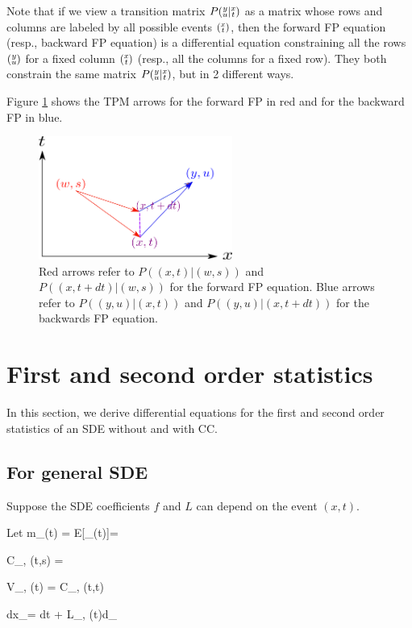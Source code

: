 Note that if we view
a transition matrix 
$P({\substack{y\\u}}|{\substack{x\\t}})$  as a matrix whose rows and columns are labeled by 
all possible events $({\substack{x\\t}})$, then the forward FP equation (resp., backward FP equation)
is a differential equation
constraining all the rows $({\substack{y\\u}})$ for a fixed column
$({\substack{x\\t}})$
(resp., all the columns for a fixed row).
They both constrain
the same matrix $P({\substack{y\\u}}|{\substack{x\\t}})$,
but in 2 different ways.

Figure \ref{fig-fokker-planck}
shows the TPM arrows for the
forward FP 
in red and for the
backward FP in blue.


\begin{figure}[h!]
\centering
\includegraphics[width=2.5in]
{stochastic-diff-eqns/fokker-planck.png}
\caption{Red arrows refer to 
$P((x,t)|(w,s))$
and $P((x,t+dt)|(w,s))$
for the forward FP equation.
Blue arrows refer to
$P((y,u)|(x,t))$
and
$P((y,u)|(x,t+dt))$
for the backwards FP equation.
}
\label{fig-fokker-planck}
\end{figure}







\section{First and second order statistics}
In this section,
we derive differential equations
for the  first and second order statistics
of an SDE without and with CC.
\subsection{For general SDE}
Suppose the SDE coefficients $f$ and $L$
can depend on the event $(x,t)$.


Let
\beq
m_\mu(t) = E[\rvx_\mu(t)]=
\eeq

\beq
C_{\mu, \nu}(t,s) = 
\eeq

\beq
V_{\mu, \nu}(t) = C_{\mu, \nu}(t,t)
\eeq


\beq
dx_\mu = \left[a_\mu(t) + F_{\mu, \nu}(t)x_\nu \right] dt + 
L_{\mu, \nu}(t)d\rvB_\nu
\eeq

